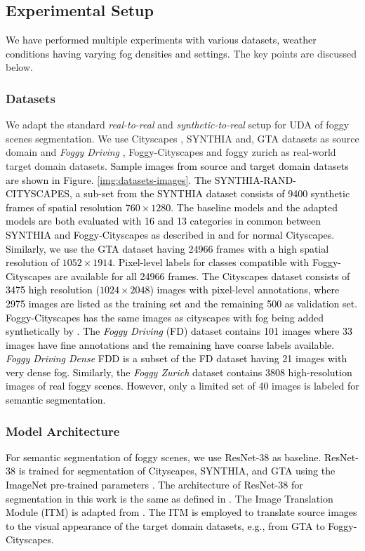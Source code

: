 \documentclass[final,5p,times,twocolumn]{elsarticle}
\begin{document}
\subsection{Experimental Setup}
\textcolor{black}{
We have performed multiple experiments with various datasets, weather conditions having varying fog densities and settings.}
The key points are discussed below.
\subsubsection{Datasets}
We adapt the standard \textit{real-to-real} and \textit{synthetic-to-real} setup for UDA of foggy scenes segmentation. We use Cityscapes \cite{Cordts2016Cityscapes}, SYNTHIA \cite{Ros_2016_CVPR} and, GTA \cite{Richter_2016_ECCV} datasets as source domain and  \textit{Foggy Driving} \cite{sakaridis2018semantic}, Foggy-Cityscapes \cite{sakaridis2018semantic} and foggy zurich \cite{dai2019curriculum} as real-world target domain datasets.  
\textcolor{black}{Sample images from source and target domain datasets are shown in Figure. \ref{img:datasets-images}. }
\textcolor{black}{
The SYNTHIA-RAND-CITYSCAPES, a sub-set from the SYNTHIA dataset consists of 9400 synthetic frames of spatial resolution $760 \times 1280$. The baseline models and the adapted models are both evaluated with 16 and 13 categories in common between SYNTHIA and Foggy-Cityscapes as described in \cite{vu2019advent} and \cite{zou2018unsupervised} for normal Cityscapes.
Similarly, we use the GTA dataset having 24966 frames with a high spatial resolution of $1052 \times 1914$. Pixel-level labels for classes compatible with Foggy-Cityscapes are available for all 24966 frames.
The Cityscapes dataset consists of 3475 high resolution ($1024 \times 2048$) images with pixel-level annotations, where 2975 images are listed as the training set and the remaining 500 as validation set. Foggy-Cityscapes has the same images as cityscapes with fog being added synthetically by \cite{sakaridis2018model}. 
\textcolor{black}{The \textit{Foggy Driving} (FD) dataset contains 101 images where 33 images have fine annotations and the remaining have coarse labels available. \textit{Foggy Driving Dense} FDD is a subset of the FD dataset having 21 images with very dense fog.}
Similarly, the \textit{Foggy Zurich} dataset contains 3808 high-resolution images of real foggy scenes. However, only a limited set of 40 images is labeled for semantic segmentation.}


\subsubsection{Model Architecture}
\textcolor{black}{
For semantic segmentation of foggy scenes, we use ResNet-38 \cite{wu2019Resnet38} as baseline. ResNet-38 is trained for segmentation of Cityscapes, SYNTHIA, and GTA using the ImageNet pre-trained parameters \cite{russakovsky2015imagenet}.
The architecture of ResNet-38 for segmentation in this work is the same as defined in \cite{wu2019Resnet38, zou2018unsupervised}. 
The Image Translation Module (ITM) is adapted from \cite{hoffman2017cycada}. The ITM is employed to translate source images to the visual appearance of the target domain datasets, e.g., from GTA to Foggy-Cityscapes.}
\end{document}
